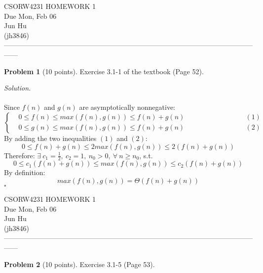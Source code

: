 \documentclass[11pt]{article}
\theoremstyle{definition}
\newtheorem{problem}{Problem}
\newenvironment{solution}{\noindent\emph{Solution.}}{\hfill$\square$}
\begin{document}
\begin{center}
\Large{} 
CSORW4231 HOMEWORK 1 \\
\normalsize{}
Due Mon, Feb 06 \\
\large{Jun Hu \\
(jh3846)} \\ 
------------------------------------------------------------------------------------------------------------------
\end{center}

\begin{problem}[10 points]
  Exercise 3.1-1 of the textbook (Page 52).
\end{problem}

\begin{solution}
\\ \\Since $f(n)$ and $g(n)$ are asymptotically nonnegative:
$$
\left \{
\begin{aligned}
&0 \leq f(n) \leq max(f(n), g(n)) \leq f(n) +g(n) 	\qquad \qquad \qquad \qquad	&(1)\\
&0 \leq g(n) \leq max(f(n), g(n)) \leq f(n) +g(n)	\qquad \qquad \qquad \qquad	&(2)
\end{aligned}
\right.
$$
By adding the two inequalities $(1)$ and $(2)$:
$$
0 \leq f(n) + g(n) \leq 2max(f(n), g(n)) \leq 2(f(n) +g(n))
$$
Therefore: $\exists \ c_1=\frac{1}{2}, \ c_2=1, \ n_0>0, \ \forall \ n \geq n_0$, s.t.
$$
0 \leq c_1(f(n) + g(n)) \leq max(f(n), g(n)) \leq  c_2(f(n) +g(n)) $$
By definition:
$$
max(f(n), g(n)) = \Theta(f(n) +g(n))
$$
\end{solution}

\newpage

\begin{center}
\Large{} 
CSORW4231 HOMEWORK 1 \\
\normalsize{}
Due Mon, Feb 06 \\
\large{Jun Hu \\
(jh3846)} \\ 
------------------------------------------------------------------------------------------------------------------
\end{center}

\begin{problem}[10 points]
  Exercise 3.1-5 (Page 53).
\end{problem}
\end{document}
